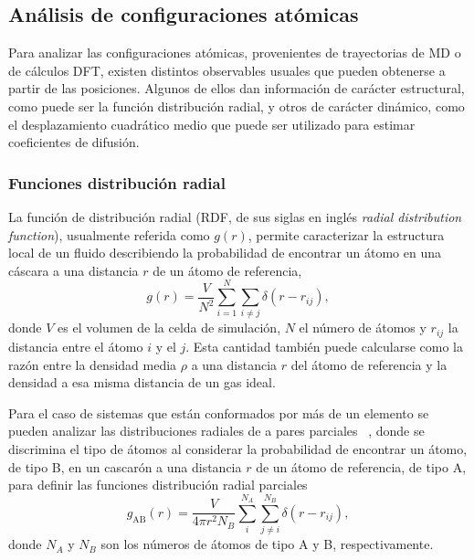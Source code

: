 \subsection{Análisis de configuraciones atómicas}\label{s:observables}

Para analizar las configuraciones atómicas, provenientes de trayectorias de MD
o de cálculos DFT, existen distintos observables usuales que pueden obtenerse
a partir de las posiciones. Algunos de ellos dan información de carácter 
estructural, como puede ser la función distribución radial, y otros de carácter 
dinámico, como el desplazamiento cuadrático medio que puede ser utilizado para 
estimar coeficientes de difusión.

\subsubsection{Funciones distribución radial}\label{ss:rdf}

La función de distribución radial (RDF, de sus siglas en inglés \textit{radial 
distribution function}), usualmente referida como $g(r)$, permite caracterizar la
estructura local de un fluido describiendo la probabilidad de encontrar un átomo
en una cáscara a una distancia $r$ de un átomo de referencia,
\begin{equation}\label{eq:rdf}
    g(r) = \frac{V}{N^2} \sum_{i=1}^N \sum_{i \neq j} \delta(r - r_{ij}),
\end{equation}
donde $V$ es el volumen de la celda de simulación, $N$ el número de átomos y 
$r_{ij}$ la distancia entre el átomo $i$ y el $j$. Esta cantidad también puede 
calcularse como la razón entre la densidad media $\rho$ a una distancia $r$ del 
átomo de referencia y la densidad a esa misma distancia de un gas ideal.

Para el caso de sistemas que están conformados por más de un elemento se pueden 
analizar las distribuciones radiales de a pares parciales ~\cite{lamparter1995}, 
donde se discrimina el tipo de átomos al considerar la probabilidad de encontrar 
un átomo, de tipo B, en un cascarón a una distancia $r$ de un átomo de referencia, 
de tipo A, para definir las funciones distribución radial parciales
\begin{equation}\label{eq:prdf}
    g_{\text{AB}}(r) = \frac{V}{4 \pi r^2 N_B} \sum_{i}^{N_A} \sum_{j\neq i}^{N_B} \delta(r - r_{ij}),
\end{equation}
donde $N_A$ y $N_B$ son los números de átomos de tipo A y B, respectivamente. 

